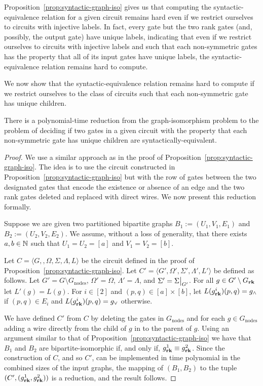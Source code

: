 \documentclass[../main/thesis.tex]{subfiles}
\begin{document}
Proposition~\ref{prop:syntactic-graph-iso} gives us that computing the
syntactic-equivalence relation for a given circuit remains hard even if we
restrict ourselves to circuits with injective labels. In fact, every gate but
the two rank gates (and, possibly, the output gate) have unique labels,
indicating that even if we restrict ourselves to circuits with injective labels
and such that each non-symmetric gates has the property that all of its input
gates have unique labels, the syntactic-equivalence relation remains hard to
compute.

We now show that the syntactic-equivalence relation remains hard to compute if
we restrict ourselves to the class of circuits such that each non-symmetric gate
has unique children.

\begin{lem}
  There is a polynomial-time reduction from the graph-isomorphism problem to the
  problem of deciding if two gates in a given circuit with the property that
  each non-symmetric gate has unique children are syntactically-equivalent.
  \label{lem:syntactic-equivalence-unique-gates-hard}
\end{lem}
\begin{proof}
  We use a similar approach as in the proof of
  Proposition~\ref{prop:syntactic-graph-iso}. The idea is to use the circuit
  constructed in Proposition~\ref{prop:syntactic-graph-iso} but with the row of
  gates between the two designated gates that encode the existence or absence of
  an edge and the two rank gates deleted and replaced with direct wires. We now
  present this reduction formally.
  
  Suppose we are given two partitioned bipartite graphs $B_1 := (U_1, V_1, E_1)$
  and $B_2 := (U_2, V_2, E_2)$. We assume, without a loss of generality, that
  there exists $a, b \in \mathbb{N}$ such that $U_1 = U_2 = [a]$ and $V_1 = V_2 =
  [b]$.

  Let $C = \langle G, , \Omega, \Sigma, \Lambda, L \rangle$ be the circuit
  defined in the proof of Proposition~\ref{prop:syntactic-graph-iso}. Let $C' =
  \langle G', \Omega', \Sigma', \Lambda', L'\rangle$ be defined as follows. Let
  $G' = G \setminus G_{\text{nodes}}$, $\Omega' = \Omega$, $\Lambda' = \Lambda$,
  and $\Sigma' = \restr{\Sigma}{G'}$. For all $g \in G' \setminus G_{\text{\textbf{rk}}}$ let
  $L'(g) = L(g)$. For $i \in [2]$ and $(p,q) \in [a] \times [b]$, let
  $L(g^i_{\text{\textbf{rk}}})(p,q) = g_{\land}$ if $(p,q) \in E_i$ and $L(g^i_{\text{\textbf{rk}}})(p,q)
  = g_{\lor}$ otherwise.

  We have defined $C'$ from $C$ by deleting the gates in $G_{\text{nodes}}$ and
  for each $g \in G_{\text{nodes}}$ adding a wire directly from the child of $g$
  in to the parent of $g$. Using an argument similar to that of
  Proposition~\ref{prop:syntactic-graph-iso} we have that $B_1$ and $B_2$ are
  bipartite-isomorphic if, and only if, $g^1_{\text{\textbf{rk}}} \equiv g^2_{\text{\textbf{rk}}}$. Since
  the construction of $C$, and so $C'$, can be implemented in time polynomial in
  the combined sizes of the input graphs, the mapping of $(B_1, B_2)$ to the
  tuple $(C', (g^1_{\text{\textbf{rk}}}, g^2_{\text{\textbf{rk}}}))$ is a reduction, and the result
  follows.
\end{proof}
\end{document}
